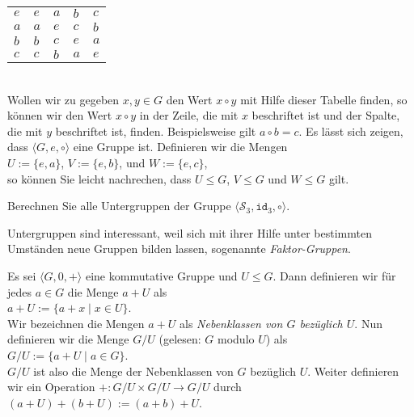 \begin{enumerate}
\begin{tabular}[t]{l|llll}
      \hline
          $e$ & $e$ & $a$ & $b$ & $c$ \\
          $a$ & $a$ & $e$ & $c$ & $b$ \\
          $b$ & $b$ & $c$ & $e$ & $a$ \\
          $c$ & $c$ & $b$ & $a$ & $e$ \\
      \end{tabular}
      \\[0.2cm]
      Wollen wir zu gegeben $x,y \in G$ den Wert $x \circ y$ mit Hilfe dieser Tabelle finden, so können
      wir den Wert $x \circ y$ in der Zeile, die mit $x$ beschriftet ist und der Spalte, die mit $y$
      beschriftet ist, finden.  Beispielsweise gilt $a \circ b = c$.  Es lässt sich zeigen, dass
      $\langle G, e, \circ \rangle$ eine Gruppe ist.  Definieren wir die Mengen
      \\[0.2cm]
      \hspace*{1.3cm} $U := \{ e, a \}$, \quad $V := \{ e, b \}$, \quad und \quad $W := \{ e, c \}$, 
      \\[0.2cm]
      so können Sie leicht nachrechen, dass 
      $U \leq G$, $V \leq G$ und $W \leq G$ gilt.
      \eox
\end{enumerate}

\exercise
Berechnen Sie alle Untergruppen der Gruppe $\langle \mathcal{S}_3, \mathtt{id}_3, \circ \rangle$.
\exend
\vspace*{0.3cm}

Untergruppen sind interessant, weil sich mit ihrer Hilfe unter bestimmten Umständen 
neue Gruppen bilden lassen, sogenannte \emph{Faktor-Gruppen}.

\begin{Definition}
  Es sei $\langle G, 0, + \rangle$ eine kommutative Gruppe und $U \leq G$.
  Dann definieren wir für jedes $a \in G$ die Menge $a + U$ als
  \\[0.2cm]
  \hspace*{1.3cm}
  $a + U := \{ a + x \mid x \in U \}$.
  \\[0.2cm]
  Wir bezeichnen die Mengen $a + U$ als \emph{Nebenklassen von $G$ bezüglich $U$}.
  Nun definieren wir die Menge $G/U$ (gelesen: $G$ modulo $U$) als
  \\[0.2cm]
  \hspace*{1.3cm}
  $G/U := \bigl\{ a + U \mid a \in G \bigr\}$.
  \\[0.2cm]
  $G/U$ ist also die Menge der Nebenklassen von $G$ bezüglich $U$.
  Weiter definieren wir ein Operation $+: G/U \times G/U \rightarrow G/U$ durch
  \\[0.2cm]
  \hspace*{1.3cm}
  $(a + U) + (b + U) := (a + b) + U$.
\end{Definition}

